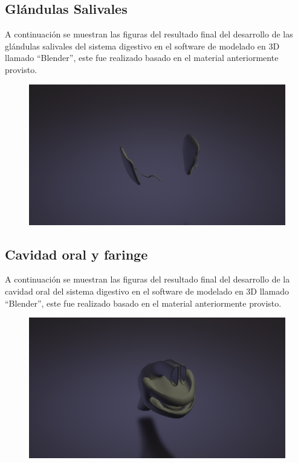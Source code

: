 \subsection{Glándulas Salivales}
A continuación se muestran las figuras del resultado final del desarrollo de las glándulas salivales del sistema digestivo en el software de modelado en 3D llamado “Blender”, este fue realizado basado en el material anteriormente provisto.\\
\begin{figure}[H]
	\begin{center}
 		\includegraphics[width = .5\textwidth]{source/images/image41.png}
	\end{center} 
\end{figure}

\subsection{Cavidad oral y faringe}
A continuación se muestran las figuras del resultado final del desarrollo de la cavidad oral del sistema digestivo en el software de modelado en 3D llamado “Blender”, este fue realizado basado en el material anteriormente provisto.\\
\begin{figure}[H]
	\begin{center}
 		\includegraphics[width = .5\textwidth]{source/images/image14.png}
	\end{center} 
\end{figure}

